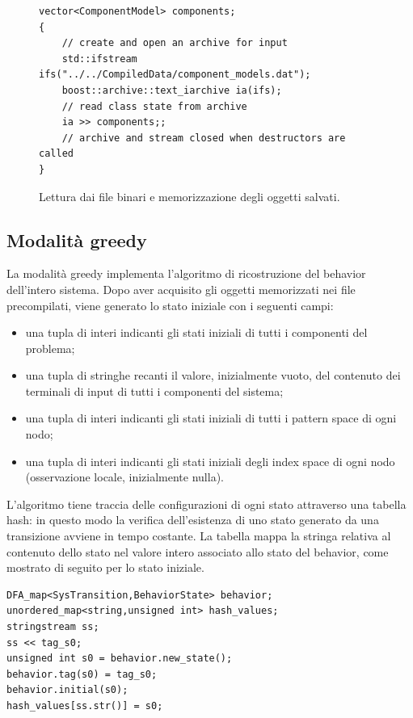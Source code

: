 \begin{figure}[htbp]
\begin{verbatim}
vector<ComponentModel> components;
{
    // create and open an archive for input
    std::ifstream ifs("../../CompiledData/component_models.dat");
    boost::archive::text_iarchive ia(ifs);
    // read class state from archive
    ia >> components;;
    // archive and stream closed when destructors are called
}
\end{verbatim}
\caption{Lettura dai file binari e memorizzazione degli oggetti salvati.}
\label{code:read_files}
\end{figure}

\subsection{Modalità greedy}
La modalità greedy implementa l'algoritmo di ricostruzione del behavior dell'intero sistema. Dopo aver acquisito gli oggetti memorizzati nei file precompilati, viene generato lo stato iniziale con i seguenti campi:
\begin{itemize}
\item una tupla di interi indicanti gli stati iniziali di tutti i componenti del problema;
\item una tupla di stringhe recanti il valore, inizialmente vuoto, del contenuto dei terminali di input di tutti i componenti del sistema;
\item una tupla di interi indicanti gli stati iniziali di tutti i pattern space di ogni nodo;
\item una tupla di interi indicanti gli stati iniziali degli index space di ogni nodo (osservazione locale, inizialmente nulla).
\end{itemize} 
L'algoritmo tiene traccia delle configurazioni di ogni stato attraverso una tabella hash: in questo modo la verifica dell'esistenza di uno stato generato da una transizione avviene in tempo costante. La tabella mappa la stringa relativa al contenuto dello stato nel valore intero associato allo stato del behavior, come mostrato di seguito per lo stato iniziale.

\begin{verbatim}
DFA_map<SysTransition,BehaviorState> behavior;
unordered_map<string,unsigned int> hash_values;
stringstream ss;
ss << tag_s0;
unsigned int s0 = behavior.new_state();
behavior.tag(s0) = tag_s0;
behavior.initial(s0);
hash_values[ss.str()] = s0;
\end{verbatim}

